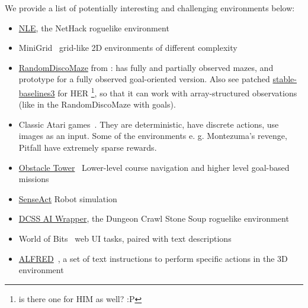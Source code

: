 \documentclass[acmsmall, nonacm]{acmart}
\begin{document}
We provide a list of potentially interesting and challenging environments below:

\begin{itemize}
  \item \href{https://github.com/facebookresearch/nle}{NLE}, the NetHack roguelike environment~\citep{kuttler_nethack_2020}

  \item MiniGrid~\citep{gym_minigrid} grid-like 2D environments of different complexity

  \item \href{https://github.com/ivannz/gymDiscoMaze.git@stable}{RandomDiscoMaze} from \citep[sec.~4.1]{badia_never_2020}: has fully and partially observed mazes, and prototype for a fully observed goal-oriented version.
  Also see patched \href{https://github.com/ivannz/stable-baselines3.git@her-multibinary-patch}{stable-baselines3} for HER%
  \footnote{
    is there one for HIM as well? :P
  }, so that it can work with array-structured observations (like in the RandomDiscoMaze with goals).

  \item Classic Atari games~\citep{Mnih2013PlayingAW}. They are deterministic, have discrete actions, use images as an input. Some of the environments e. g. Montezuma's revenge, Pitfall have extremely sparse rewards.
  
  \item \href{https://github.com/Unity-Technologies/obstacle-tower-env}{Obstacle Tower}~\citep{juliani_obstacle_2019} Lower-level course navigation and higher level goal-based missions
  
  \item \href{https://github.com/kindredresearch/SenseAct}{SenseAct} Robot simulation
  
  \item \href{https://github.com/dtdannen/dcss-ai-wrapper}{DCSS AI Wrapper}, the Dungeon Crawl Stone Soup roguelike environment
  
  \item World of Bits~\citep{Shi2017WorldOB} web UI tasks, paired with text descriptions
  
  \item \href{https://askforalfred.com/}{ALFRED}~\citep{ALFRED20}, a set of text instructions to perform specific actions in the 3D environment
\end{itemize}


\medskip



\end{document}
